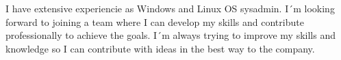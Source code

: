 \documentclass[9pt]{developercv} %
\begin{document}
\vspace{0.3cm}



\begin{minipage}[t]{0.460\textwidth} %
	\vspace{-\baselineskip} %
	
	I have extensive experiencie as Windows and Linux OS sysadmin. I´m looking
	forward to joining a team where I can develop my skills and contribute professionally to achieve the goals. I´m
	always trying to improve my skills and knowledge so I can contribute with ideas in the best way to the company. \\ %
\end{minipage}
\hfill %
\begin{minipage}[t]{0.43\textwidth} %
	\vspace{-\baselineskip} %
	\begin{barchart}{5}
	\end{barchart}
\end{minipage}

\begin{entrylist}
	\hspace{2mm} 
	\hspace{2mm} 
	\hspace{2mm} 
	\hspace{2mm} 
\end{entrylist}
		
\end{document}
